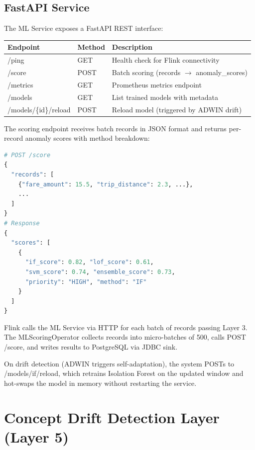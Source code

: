\subsection{FastAPI Service}

The ML Service exposes a FastAPI REST interface:

\begin{longtable}{|m{3.5cm}|m{2.5cm}|m{7cm}|}
\hline
\textbf{Endpoint} & \textbf{Method} & \textbf{Description} \\ \hline
/ping & GET & Health check for Flink connectivity \\ \hline
/score & POST & Batch scoring (records $\to$ anomaly\_scores) \\ \hline
/metrics & GET & Prometheus metrics endpoint \\ \hline
/models & GET & List trained models with metadata \\ \hline
/models/\{id\}/reload & POST & Reload model (triggered by ADWIN drift) \\ \hline
\end{longtable}

The scoring endpoint receives batch records in JSON format and returns per-record anomaly scores with method breakdown:

\begin{lstlisting}[language=Python]
# POST /score
{
  "records": [
    {"fare_amount": 15.5, "trip_distance": 2.3, ...},
    ...
  ]
}
# Response
{
  "scores": [
    {
      "if_score": 0.82, "lof_score": 0.61,
      "svm_score": 0.74, "ensemble_score": 0.73,
      "priority": "HIGH", "method": "IF"
    }
  ]
}
\end{lstlisting}

Flink calls the ML Service via HTTP for each batch of records passing Layer 3. The MLScoringOperator collects records into micro-batches of 500, calls POST /score, and writes results to PostgreSQL via JDBC sink.

On drift detection (ADWIN triggers self-adaptation), the system POSTs to /models/if/reload, which retrains Isolation Forest on the updated window and hot-swaps the model in memory without restarting the service.

\section{Concept Drift Detection Layer (Layer 5)}

